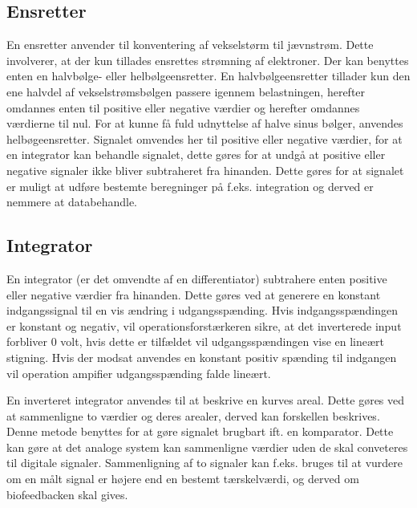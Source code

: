 \subsection{Ensretter}
En ensretter anvender til konventering af vekselstørm til jævnstrøm. Dette involverer, at der kun tillades ensrettes strømning af elektroner. Der kan benyttes enten en halvbølge- eller helbølgeensretter. En halvbølgeensretter tillader kun den ene halvdel af vekselstrømsbølgen passere igennem belastningen, herefter omdannes enten til positive eller negative værdier og herefter omdannes værdierne til nul.
For at kunne få fuld udnyttelse af halve sinus bølger, anvendes helbøgeensretter. Signalet omvendes her til positive eller negative værdier, for at en integrator kan behandle signalet, dette gøres for at undgå at positive eller negative signaler ikke bliver subtraheret fra hinanden. \cite{EEtech2003} Dette gøres for at signalet er muligt at udføre bestemte beregninger på f.eks. integration og derved er nemmere at databehandle.  

\subsection{Integrator}
En integrator (er det omvendte af en differentiator) subtrahere enten positive eller negative værdier fra hinanden. Dette gøres ved at generere en konstant indgangssignal til en vis ændring i udgangsspænding. Hvis indgangsspændingen er konstant og negativ, vil operationsforstærkeren sikre, at det inverterede input forbliver 0 volt, hvis dette er tilfældet vil udgangsspændingen vise en lineært stigning. Hvis der modsat anvendes en konstant positiv spænding til indgangen vil operation ampifier udgangsspænding falde lineært. \cite{EEtech2003}

En inverteret integrator anvendes til at beskrive en kurves areal. Dette gøres ved at sammenligne to værdier og deres arealer, derved kan forskellen beskrives. Denne metode benyttes for at gøre signalet brugbart ift. en komparator. Dette kan gøre at det analoge system kan sammenligne værdier uden de skal conveteres til digitale signaler. Sammenligning af to signaler kan f.eks. bruges til at vurdere om en målt signal er højere end en bestemt tærskelværdi, og derved om biofeedbacken skal gives. 


